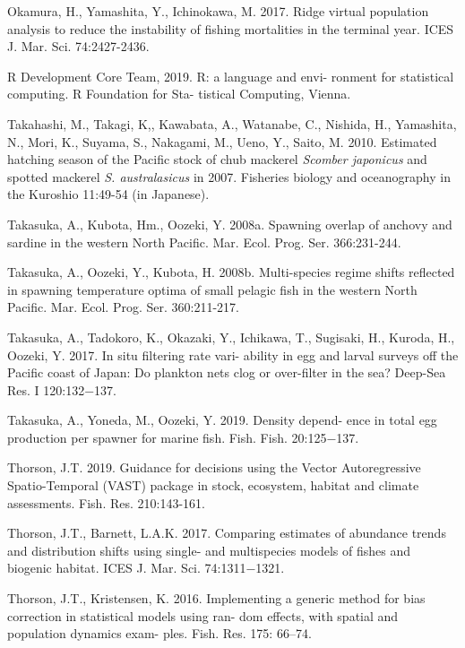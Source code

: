 \documentclass[12pt]{article}
\begin{document}
\begin{linenumbers}
\hangindent=30pt
\noindent
Okamura, H., Yamashita, Y., Ichinokawa, M. 2017. Ridge virtual population analysis to reduce the instability of fishing mortalities in the terminal year. ICES J. Mar. Sci. 74:2427-2436.

\hangindent=30pt
\noindent
R Development Core Team, 2019. R: a language and envi- ronment for statistical computing. R Foundation for Sta- tistical Computing, Vienna.

\hangindent=30pt
\noindent
Takahashi, M., Takagi, K,, Kawabata, A., Watanabe, C., Nishida, H., Yamashita, N., Mori, K., Suyama, S., Nakagami, M., Ueno, Y., Saito, M. 2010. Estimated hatching season of the Pacific stock of chub mackerel \textit{Scomber japonicus} and spotted mackerel \textit{S. australasicus} in 2007. Fisheries biology and oceanography in the Kuroshio 11:49-54 (in Japanese).

\hangindent=30pt
\noindent
Takasuka, A., Kubota, Hm., Oozeki, Y. 2008a. Spawning overlap of anchovy and sardine in the western North Pacific. Mar. Ecol. Prog. Ser. 366:231-244.

\hangindent=30pt
\noindent
Takasuka, A., Oozeki, Y., Kubota, H. 2008b. Multi-species regime shifts reflected in spawning temperature optima of small pelagic fish in the western North Pacific. Mar. Ecol. Prog. Ser. 360:211-217.

\hangindent=30pt
\noindent
Takasuka, A., Tadokoro, K., Okazaki, Y., Ichikawa, T., Sugisaki, H., Kuroda, H., Oozeki, Y. 2017. In situ filtering rate vari- ability in egg and larval surveys off the Pacific coast of Japan: Do plankton nets clog or over-filter in the sea? Deep-Sea Res. I 120:132−137.

\hangindent=30pt
\noindent
Takasuka, A., Yoneda, M., Oozeki, Y. 2019. Density depend- ence in total egg production per spawner for marine fish. Fish. Fish. 20:125−137.

\hangindent=30pt
\noindent
Thorson, J.T. 2019.  Guidance for decisions using the Vector Autoregressive Spatio-Temporal (VAST) package in stock, ecosystem, habitat and climate assessments. Fish. Res. 210:143-161.

\hangindent=30pt
\noindent
Thorson, J.T., Barnett, L.A.K. 2017. Comparing estimates of abundance trends and distribution shifts using single- and multispecies models of fishes and biogenic habitat. ICES J. Mar. Sci. 74:1311−1321.

\hangindent=30pt
\noindent
Thorson, J.T., Kristensen, K. 2016. Implementing a generic method for bias correction in statistical models using ran- dom effects, with spatial and population dynamics exam- ples. Fish. Res. 175: 66–74.


\end{linenumbers}
\end{document}
